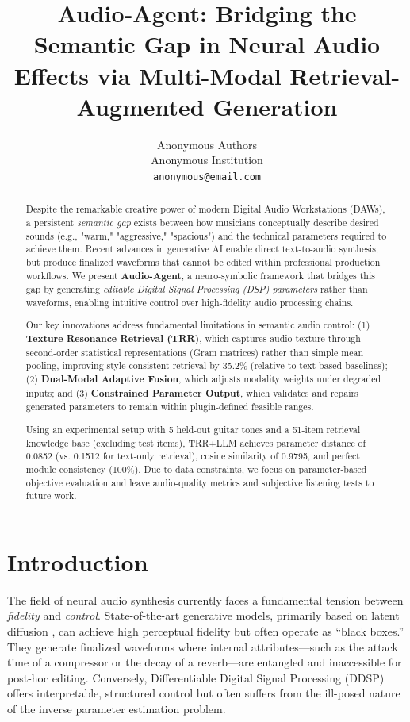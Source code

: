 \documentclass{article}
\title{Audio-Agent: Bridging the Semantic Gap in Neural Audio Effects via Multi-Modal Retrieval-Augmented Generation}
\author{
Anonymous Authors \\
Anonymous Institution \\
\texttt{anonymous@email.com}
}
\begin{document}
\maketitle

\begin{abstract}
	Despite the remarkable creative power of modern Digital Audio Workstations (DAWs), a persistent \textit{semantic gap} exists between how musicians conceptually describe desired sounds (e.g., "warm," "aggressive," "spacious") and the technical parameters required to achieve them. Recent advances in generative AI enable direct text-to-audio synthesis, but produce finalized waveforms that cannot be edited within professional production workflows. We present \textbf{Audio-Agent}, a neuro-symbolic framework that bridges this gap by generating \textit{editable Digital Signal Processing (DSP) parameters} rather than waveforms, enabling intuitive control over high-fidelity audio processing chains.

	Our key innovations address fundamental limitations in semantic audio control: (1) \textbf{Texture Resonance Retrieval (TRR)}, which captures audio texture through second-order statistical representations (Gram matrices) rather than simple mean pooling, improving style-consistent retrieval by 35.2\% (relative to text-based baselines); (2) \textbf{Dual-Modal Adaptive Fusion}, which adjusts modality weights under degraded inputs; and (3) \textbf{Constrained Parameter Output}, which validates and repairs generated parameters to remain within plugin-defined feasible ranges.

	Using an experimental setup with 5 held-out guitar tones and a 51-item retrieval knowledge base (excluding test items), TRR+LLM achieves parameter distance of 0.0852 (vs. 0.1512 for text-only retrieval), cosine similarity of 0.9795, and perfect module consistency (100\%). Due to data constraints, we focus on parameter-based objective evaluation and leave audio-quality metrics and subjective listening tests to future work.
\end{abstract}

\section{Introduction}
\label{sec:introduction}

The field of neural audio synthesis currently faces a fundamental tension between \textit{fidelity} and \textit{control}. State-of-the-art generative models, primarily based on latent diffusion \citep{liu2023audioldm,agostinelli2023musiclm}, can achieve high perceptual fidelity but often operate as ``black boxes.'' They generate finalized waveforms where internal attributes—such as the attack time of a compressor or the decay of a reverb—are entangled and inaccessible for post-hoc editing. Conversely, Differentiable Digital Signal Processing (DDSP) \citep{engel2020ddsp} offers interpretable, structured control but often suffers from the ill-posed nature of the inverse parameter estimation problem.
\end{document}
